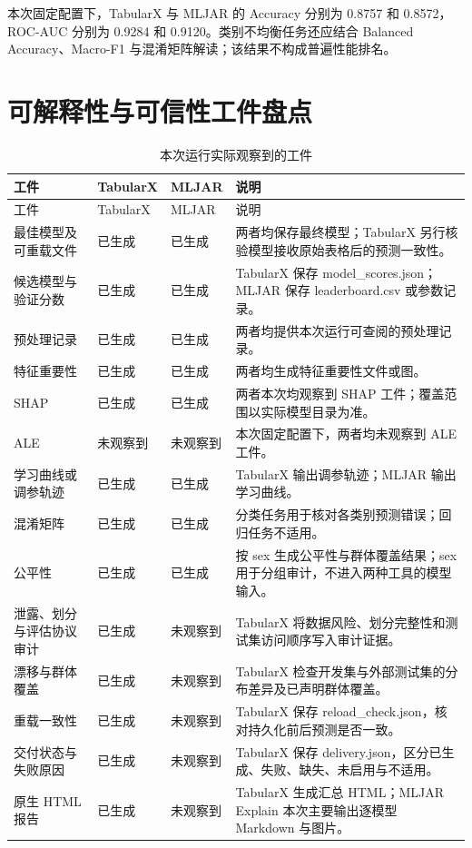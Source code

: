 \documentclass[degree=bachelor,language=chinese,fontset=fandol]{thuthesis}
\newcommand{\yes}{\textcolor{green!50!black}{已生成}}
\newcommand{\no}{\textcolor{red!70!black}{未观察到}}
\begin{document}
本次固定配置下，TabularX 与 MLJAR 的 Accuracy 分别为 0.8757 和 0.8572，ROC-AUC 分别为 0.9284 和 0.9120。类别不均衡任务还应结合 Balanced Accuracy、Macro-F1 与混淆矩阵解读；该结果不构成普遍性能排名。

\section{可解释性与可信性工件盘点}
\begin{longtable}{>{\raggedright\arraybackslash}p{}>{\centering\arraybackslash}p{}>{\centering\arraybackslash}p{}>{\raggedright\arraybackslash}p{}}
  \caption{本次运行实际观察到的工件}\label{tab:artifacts}\\
  \toprule
  工件 & TabularX & MLJAR & 说明 \\
  \midrule
  \endfirsthead
  \toprule
  工件 & TabularX & MLJAR & 说明 \\
  \midrule
  \endhead
  最佳模型及可重载文件 & \yes & \yes & 两者均保存最终模型；TabularX 另行核验模型接收原始表格后的预测一致性。 \\
  候选模型与验证分数 & \yes & \yes & TabularX 保存 model\_scores.json；MLJAR 保存 leaderboard.csv 或参数记录。 \\
  预处理记录 & \yes & \yes & 两者均提供本次运行可查阅的预处理记录。 \\
  特征重要性 & \yes & \yes & 两者均生成特征重要性文件或图。 \\
  SHAP & \yes & \yes & 两者本次均观察到 SHAP 工件；覆盖范围以实际模型目录为准。 \\
  ALE & \no & \no & 本次固定配置下，两者均未观察到 ALE 工件。 \\
  学习曲线或调参轨迹 & \yes & \yes & TabularX 输出调参轨迹；MLJAR 输出学习曲线。 \\
  混淆矩阵 & \yes & \yes & 分类任务用于核对各类别预测错误；回归任务不适用。 \\
  公平性 & \yes & \yes & 按 sex 生成公平性与群体覆盖结果；sex 用于分组审计，不进入两种工具的模型输入。 \\
  泄露、划分与评估协议审计 & \yes & \no & TabularX 将数据风险、划分完整性和测试集访问顺序写入审计证据。 \\
  漂移与群体覆盖 & \yes & \no & TabularX 检查开发集与外部测试集的分布差异及已声明群体覆盖。 \\
  重载一致性 & \yes & \no & TabularX 保存 reload\_check.json，核对持久化前后预测是否一致。 \\
  交付状态与失败原因 & \yes & \no & TabularX 保存 delivery.json，区分已生成、失败、缺失、未启用与不适用。 \\
  原生 HTML 报告 & \yes & \no & TabularX 生成汇总 HTML；MLJAR Explain 本次主要输出逐模型 Markdown 与图片。 \\
  \bottomrule
\end{longtable}
\end{document}

